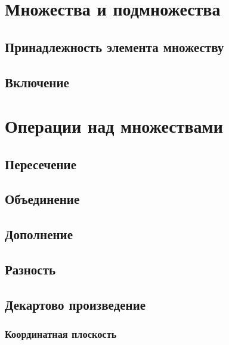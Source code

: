 \documentclass[
  letterpaper,
  DIV=11,
  numbers=noendperiod]{scrreprt}
\theoremstyle{definition}
\theoremstyle{remark}
\begin{document}
\section{Множества и подмножества}\label{math-settheory-set}

\subsection{Принадлежность элемента
множеству}\label{math-settheory-set-in}

\subsection{Включение}\label{math-settheory-set-include}

\section{Операции над множествами}\label{math-settheory-operations}

\subsection{Пересечение}\label{math-settheory-operation-intersection}

\subsection{Объединение}\label{math-settheory-operation-union}

\subsection{Дополнение}\label{math-settheory-operation-add}

\subsection{Разность}\label{math-settheory-operation-diff}

\subsection{Декартово
произведение}\label{math-settheory-operation-decart}

\subsubsection{Координатная
плоскость}\label{math-settheory-operation-coordplane}
\end{document}
